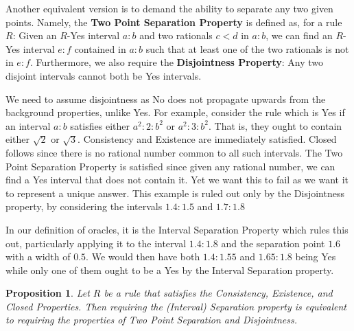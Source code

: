 \documentclass[12pt]{article}
\newtheorem{proposition}{Proposition}[subsection]
\begin{document}
Another equivalent version is to demand the ability to separate any two given points. Namely, the \textbf{Two Point Separation Property} is defined as, for a rule $R$: Given an $R$-Yes interval $a:b$ and two rationals $c < d$ in $a:b$, we can find an $R$-Yes interval $e:f$ contained in $a:b$ such that at least one of the two rationals is not in $e:f$. Furthermore, we also require the \textbf{Disjointness Property}: Any two disjoint intervals cannot both be Yes intervals. 

We need to assume disjointness as No does not propagate upwards from the background properties, unlike Yes. For example, consider the rule which is Yes if an interval $a:b$ satisfies either $a^2:2:b^2$ or $a^2:3:b^2$. That is, they ought to contain either $\sqrt{2}$ or $\sqrt{3}$. Consistency and Existence are immediately satisfied. Closed follows since there is no rational number common to all such intervals. The Two Point Separation Property is satisfied since given any rational number, we can find a Yes interval that does not contain it. Yet we want this to fail as we want it to represent a unique answer. This example is ruled out only by the Disjointness property, by considering the intervals $1.4:1.5$ and $1.7:1.8$

In our definition of oracles, it is the Interval Separation Property which rules this out, particularly applying it to the interval $1.4:1.8$ and the separation point $1.6$ with a width of $0.5$. We would then have both $1.4:1.55$ and $1.65:1.8$ being Yes while only one of them ought to be a Yes by the Interval Separation property.  

\begin{proposition}
    Let $R$ be a rule that satisfies the Consistency, Existence, and Closed Properties. Then requiring the (Interval) Separation property is equivalent to requiring the properties of Two Point Separation and Disjointness. 
\end{proposition}
\end{document}
